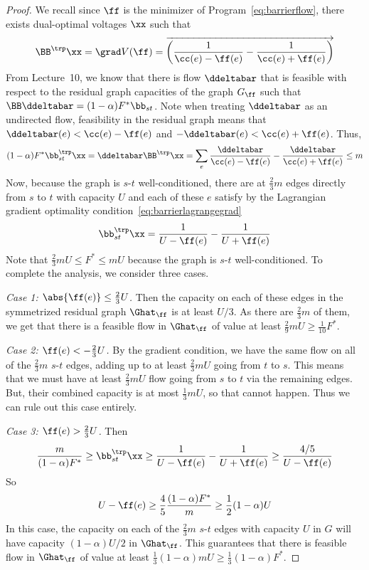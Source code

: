 \begin{proof}
  We recall since $\ff$ is the minimizer of
  Program~\eqref{eq:barrierflow}, there exists dual-optimal voltages
  $\xx$ such that
  \[
    \BB^{\trp} \xx = \grad V(\ff) =
    \cvec{\frac{1}
    {\cc(e)-\ff(e)}
    -
    \frac{1}
    {\cc(e)+\ff(e)}}
  \]
From Lecture~10, we know that there is flow $\ddeltabar$ that is feasible with
respect to the residual graph capacities of the graph $G_{\ff}$ such
that $\BB \ddeltabar = (1-\alpha)F^* \bb_{st}$.
Note when treating $\ddeltabar$ as an undirected
flow, feasibility in the residual graph means that $\ddeltabar(e) < \cc(e)-\ff(e)$
and $-\ddeltabar(e) < \cc(e)+\ff(e)$.
Thus,
\[
  (1-\alpha)F^* \bb_{st}^{\trp}
  \xx
  =
  \ddeltabar 
  \BB^{\trp} \xx
  =
  \sum_e
  \frac{\ddeltabar}
    {\cc(e)-\ff(e)}
    -
    \frac{\ddeltabar}
    {\cc(e)+\ff(e)}
    \leq
    m
  \]
  Now, because the graph is $s$-$t$ well-conditioned,
  there are at $\frac{2}{3} m $ edges directly from $s$ to $t$ with capacity $U$
  and each of these $e$
 satisfy by the Lagrangian gradient optimality condition~\eqref{eq:barrierlagrangegrad}
 \[
   \bb_{st}^{\trp}
  \xx
   =
  \frac{1}
    {U-\ff(e)}
    -
    \frac{1}
    {U+\ff(e)}
  \]
Note that $\frac{2}{3} mU \leq F^* \leq mU$ because the graph is $s$-$t$
well-conditioned.
To complete the analysis, we consider three cases.

\emph{Case 1: $\abs{\ff(e)} \leq \frac{2}{3} U$.}
Then the capacity on each of these edges in the symmetrized residual
graph $\Ghat_{\ff}$ is at least $U/3$.
As there are $\frac{2}{3} m $ of them,
we get that there is a feasible flow in $\Ghat_{\ff}$ of value at least
$\frac{2}{9} mU\geq \frac{1}{10} F^*$. 

\emph{Case 2: $\ff(e) < -\frac{2}{3} U$.}
By the gradient condition, we have the same flow on all of the $\frac{2}{3} m$
$s$-$t$ edges, adding  up to at least $\frac{2}{3} mU$ going from $t$ to $s$.
This means that we must have at least $\frac{2}{3} mU$ flow going from
$s$ to $t$ via the remaining edges. But, their combined capacity is at
most $\frac{1}{3} mU$, so that cannot happen. Thus we can rule out
this case entirely.

\emph{Case 3: $\ff(e) > \frac{2}{3} U$.}
Then 
\[
  \frac{m}{(1-\alpha)F^* }
  \geq
     \bb_{st}^{\trp}
     \xx
 \geq
  \frac{1}
    {U-\ff(e)}
    -
    \frac{1}
    {U+\ff(e)}
 \geq
   \frac{4/5}
    {U-\ff(e)}
  \]
So
\[
  U-\ff(e) \geq \frac{4}{5}  \frac{(1-\alpha)F^* }{m}
  \geq \frac{1}{2}
(1-\alpha) U
\]
In this case, the capacity on each of the $\frac{2}{3} m$ 
$s$-$t$ edges with capacity $U$ in $G$ will
have capacity $(1-\alpha) U/2$ in $\Ghat_{\ff}$.
This guarantees that there is feasible flow in $\Ghat_{\ff}$ of value
at least $\frac{1}{3} (1-\alpha) mU \geq \frac{1}{3} (1-\alpha) F^*$.
\end{proof}

